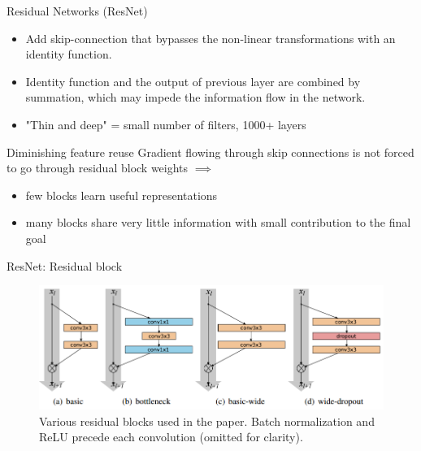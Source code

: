 \documentclass{beamer}
\begin{document}
\begin{frame}{Residual Networks (ResNet)}
\begin{itemize}
\item Add skip-connection that bypasses the non-linear transformations with an identity function.
\item Identity function and the output of previous layer are combined by summation, which may impede the information flow in the network.
\item "Thin and deep" = small number of filters, 1000+ layers
\end{itemize}

\begin{block}{Diminishing feature reuse}
Gradient flowing through skip connections is not forced to go through residual block weights $\implies$ 

\begin{itemize}
\item few blocks learn useful representations 
\item many blocks share very little information with
small contribution to the final goal
\end{itemize}
\end{block}

\end{frame}
\begin{frame}{ResNet: Residual block}
\begin{figure}[h]
\includegraphics[width=\textwidth]{img/resnet_blocks}
\caption{Various residual blocks used in the paper. Batch normalization and ReLU precede
each convolution (omitted for clarity). \cite{cit:resnet}}
\end{figure}
\end{frame}
\end{document}
